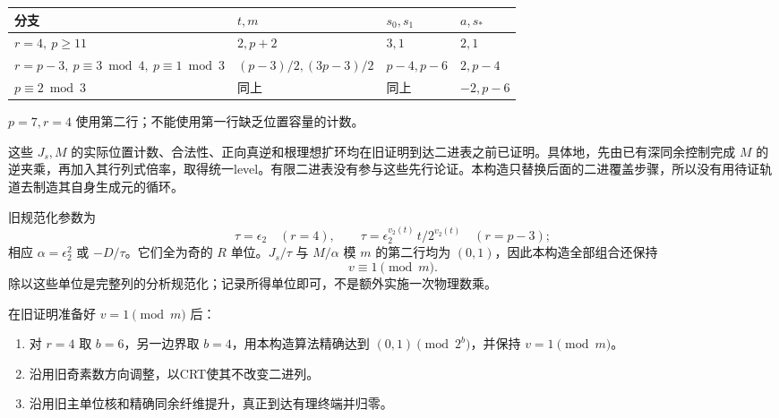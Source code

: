 \documentclass[11pt,a4paper]{article}
\newcommand{\tightlist}{\setlength{\itemsep}{0pt}\setlength{\parskip}{0pt}}
\theoremstyle{definition}
\numberwithin{equation}{section}
\begin{document}
{ %
\begin{longtable}[]{@{}
  >{\raggedright\arraybackslash}p{}
  >{\raggedright\arraybackslash}p{}
  >{\raggedright\arraybackslash}p{}
  >{\raggedright\arraybackslash}p{}@{}}
\toprule\noalign{}
\begin{minipage}[b]{\linewidth}\raggedright
{分支}
\end{minipage} & \begin{minipage}[b]{\linewidth}\raggedright
\(t,m\)
\end{minipage} & \begin{minipage}[b]{\linewidth}\raggedright
\(s_0,s_1\)
\end{minipage} & \begin{minipage}[b]{\linewidth}\raggedright
\(a,s_*\)
\end{minipage} \\
\midrule\noalign{}
\endhead
\bottomrule\noalign{}
\endlastfoot
\(r=4,\ p\ge11\) & \(2,p+2\) & \(3,1\) & \(2,1\) \\
\(r=p-3,\ p\equiv3\bmod4,\ p\equiv1\bmod3\) & \((p-3)/2,(3p-3)/2\) & \(p-4,p-6\) & \(2,p-4\) \\
{同上且} \(p\equiv2\bmod3\) & {同上} & {同上} & \(-2,p-6\) \\
\end{longtable}
}

\(p=7,r=4\) {使用第二行；不能使用第一行缺乏位置容量的计数。}

{这些} \(J_s,M\) {的实际位置计数、合法性、正向真逆和根理想扩环均在旧证明到达二进表之前已证明。具体地，先由已有深同余控制完成} \(M\) {的逆夹乘，再加入其行列式倍率，取得统一level。有限二进表没有参与这些先行论证。本构造只替换后面的二进覆盖步骤，所以没有用待证轨道去制造其自身生成元的循环。}

{旧规范化参数为} \[
\tau=\epsilon_2\quad(r=4),\qquad
\tau=\epsilon_2^{v_2(t)}\,t/2^{v_2(t)}
       \quad(r=p-3);
\] {相应} \(\alpha=\epsilon_2^2\) {或} \(-D/\tau\){。它们全为奇的} \(R\) {单位。}\(J_s/\tau\) {与} \(M/\alpha\) {模} \(m\) {的第二行均为} \((0,1)\){，因此本构造全部组合还保持} \[
v\equiv1\pmod m.
\] {除以这些单位是完整列的分析规范化；记录所得单位即可，不是额外实施一次物理数乘。}

{在旧证明准备好} \(v=1\pmod m\) {后：}

\begin{enumerate}
\def\labelenumi{\arabic{enumi}.}
\tightlist
\item
  {对} \(r=4\) {取} \(b=6\){，另一边界取} \(b=4\){，用本构造算法精确达到} \((0,1)\pmod{2^b}\){，并保持} \(v=1\pmod m\){。}
\item
  {沿用旧奇素数方向调整，以CRT使其不改变二进列。}
\item
  {沿用旧主单位核和精确同余纤维提升，真正到达有理终端并归零。}
\end{enumerate}
\end{document}
